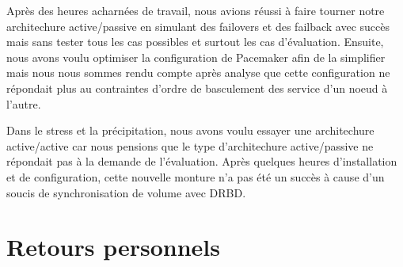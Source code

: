 \documentclass[11pt,a4paper]{report}
\begin{document}
            Après des heures acharnées de travail, nous avions réussi à faire tourner notre architechure active/passive en simulant des failovers et des failback avec succès mais sans tester tous les cas possibles et surtout les cas d'évaluation. Ensuite, nous avons voulu optimiser la configuration de Pacemaker afin de la simplifier mais nous nous sommes rendu compte après analyse que cette configuration ne répondait plus au contraintes d'ordre de basculement des service d'un noeud à l'autre.
            
            Dans le stress et la précipitation, nous avons voulu essayer une architechure active/active car nous pensions que le type d'architechure active/passive ne répondait pas à la demande de l'évaluation. Après quelques heures d'installation et de configuration, cette nouvelle monture n'a pas été un succès à cause d'un soucis de synchronisation de volume avec DRBD.
        
        \section{Retours personnels}
\end{document}
